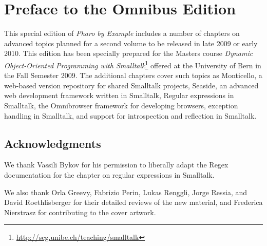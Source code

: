 \documentclass[a4paper,10pt,twoside]{book}
\begin{document}
	\sloppy
	\frontmatter
\fi
\chapter{Preface to the Omnibus Edition}

This special edition of \emph{Pharo by Example} includes a number of chapters on advanced topics planned for a second volume to be released in late 2009 or early 2010.
This edition has been specially prepared for the Masters course \emph{Dynamic Object-Oriented Programming with Smalltalk}\footnote{\url{http://scg.unibe.ch/teaching/smalltalk}} offered at the University of Bern in the Fall Semester 2009.
The additional chapters cover such topics as
Monticello, a web-based version repository for shared Smalltalk projects,
Seaside, an advanced web development framework written in Smalltalk,
Regular expressions in Smalltalk,
the Omnibrowser framework for developing browsers,
exception handling in Smalltalk, and
support for introspection and reflection in Smalltalk.

\section*{Acknowledgments}

We thank Vassili Bykov for his permission to liberally adapt the Regex documentation for the chapter on regular expressions in Smalltalk.

We also thank
Orla Greevy,
Fabrizio Perin,
Lukas Renggli,
Jorge Ressia,
and
David Roethlisberger
for their detailed reviews of the new material,
and Frederica Nierstrasz for contributing to the cover artwork.




\ifx\wholebook\relax\else
   
   
\end{document}
